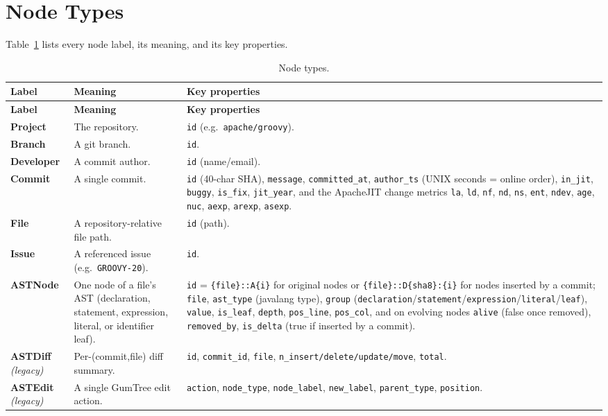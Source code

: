 \documentclass[11pt,a4paper]{article}
\newcommand{\code}[1]{\texttt{#1}}
\newcommand{\node}[1]{\textcolor{kgblue}{\textbf{#1}}}
\begin{document}
	\section{Node Types}
	Table~\ref{tab:nodes} lists every node label, its meaning, and its key
	properties.
	
	\begin{longtable}{@{}p{2.4cm}p{4.4cm}p{7.6cm}@{}}
		\caption{Node types.}\label{tab:nodes}\\
		\toprule
		\textbf{Label} & \textbf{Meaning} & \textbf{Key properties}\\
		\midrule
		\endfirsthead
		\toprule
		\textbf{Label} & \textbf{Meaning} & \textbf{Key properties}\\
		\midrule
		\endhead
		\node{Project} & The repository. & \code{id} (e.g.\ \texttt{apache/groovy}).\\
		\addlinespace
		\node{Branch} & A git branch. & \code{id}.\\
		\addlinespace
		\node{Developer} & A commit author. & \code{id} (name/email).\\
		\addlinespace
		\node{Commit} & A single commit. & \code{id} (40-char SHA), \code{message},
		\code{committed\_at}, \code{author\_ts} (UNIX seconds = online order),
		\code{in\_jit}, \code{buggy}, \code{is\_fix}, \code{jit\_year}, and the
		ApacheJIT change metrics \code{la}, \code{ld}, \code{nf}, \code{nd},
		\code{ns}, \code{ent}, \code{ndev}, \code{age}, \code{nuc}, \code{aexp},
		\code{arexp}, \code{asexp}.\\
		\addlinespace
		\node{File} & A repository-relative file path. & \code{id} (path).\\
		\addlinespace
		\node{Issue} & A referenced issue (e.g.\ \texttt{GROOVY-20}). & \code{id}.\\
		\addlinespace
		\node{ASTNode} & One node of a file's AST (declaration, statement, expression,
		literal, or identifier leaf). & \code{id} =
		\texttt{\{file\}::A\{i\}} for original nodes or
		\texttt{\{file\}::D\{sha8\}:\{i\}} for nodes inserted by a commit;
		\code{file}, \code{ast\_type} (javalang type), \code{group}
		(\texttt{declaration}/\texttt{statement}/\texttt{expression}/\texttt{literal}/\texttt{leaf}),
		\code{value}, \code{is\_leaf}, \code{depth}, \code{pos\_line},
		\code{pos\_col}, and on evolving nodes \code{alive} (false once removed),
		\code{removed\_by}, \code{is\_delta} (true if inserted by a commit).\\
		\addlinespace
		\node{ASTDiff} \emph{(legacy)} & Per-(commit,file) diff summary. &
		\code{id}, \code{commit\_id}, \code{file}, \code{n\_insert/delete/update/move},
		\code{total}.\\
		\addlinespace
		\node{ASTEdit} \emph{(legacy)} & A single GumTree edit action. &
		\code{action}, \code{node\_type}, \code{node\_label}, \code{new\_label},
		\code{parent\_type}, \code{position}.\\
		\bottomrule
	\end{longtable}
	
\end{document}
